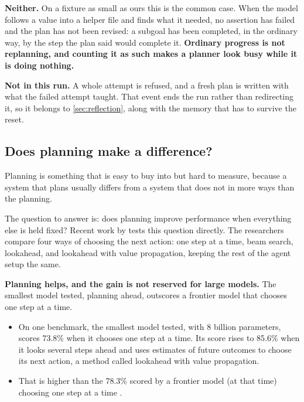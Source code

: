 \item \textbf{Neither.} On a fixture as small as ours this is the common case. When the model
follows a value into a helper file and finds what it needed, no assertion has failed and the plan
has not been revised: a subgoal has been completed, in the ordinary way, by the step the plan said
would complete it. \textbf{Ordinary progress is not replanning, and counting it as such makes a
planner look busy while it is doing nothing.}

\item \textbf{Not in this run.} A whole attempt is refused, and a fresh plan is written with what
the failed attempt taught. That event ends the run rather than redirecting it, so it belongs to
\cref{sec:reflection}, along with the memory that has to survive the reset.

\ei


\subsection{Does planning make a difference?}
\label{sec:planning-evidence}

Planning is something that is easy to buy into but hard to measure, 
because a system that plans usually differs from a system that does 
not in more ways than the planning.

The question to answer is: does planning improve performance when everything else is held fixed? 
Recent work by \citet{wang2026reasoningplan} tests this question directly. The researchers compare
four ways of choosing the next action: one step at a time, beam search, lookahead, and lookahead
with value propagation, keeping the rest of the agent setup the same.

\textbf{Planning helps, and the gain is not reserved for large models.} The smallest model tested,
planning ahead, outscores a frontier model that chooses one step at a time.

\begin{itemize}
\item On one benchmark, the smallest model tested, with 8 billion parameters, scores 73.8\% when it chooses
one step at a time. Its score rises to 85.6\% when it looks several steps ahead and uses estimates
of future outcomes to choose its next action, a method called lookahead with value propagation.
\item That is higher than the 78.3\% scored by a frontier model (at that time) choosing one step at a time
\citep[Table~1]{wang2026reasoningplan}.
\end{itemize}

